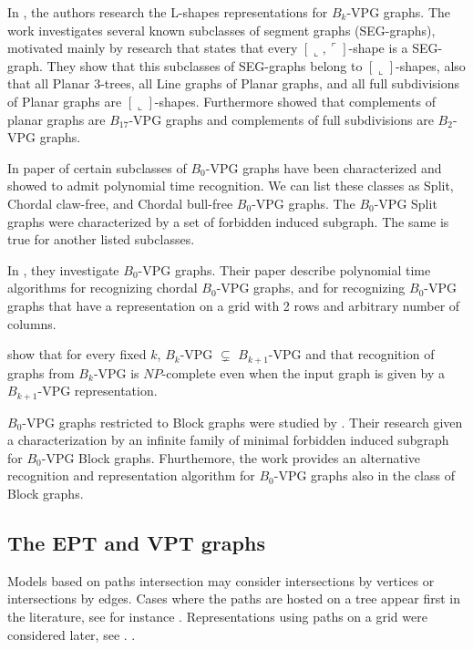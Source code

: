 In \citet{felsner2016intersection}, the authors research the L-shapes representations for $B_k$-VPG graphs. The work investigates several known subclasses of segment graphs (SEG-graphs), motivated mainly by research \cite{middendorf1992max} that states that every $[\llcorner, \ulcorner]$-shape is a SEG-graph.
They show that this subclasses of SEG-graphs belong to $[\llcorner]$-shapes, also that all Planar 3-trees, all Line graphs of Planar graphs, and all full subdivisions of Planar graphs are $[\llcorner]$-shapes. Furthermore \cite{felsner2016intersection} showed that complements of planar graphs are $B_{17}$-VPG graphs and complements of full subdivisions are $B_2$-VPG graphs. 

In paper of \citet{golumbic2013intersection} certain subclasses of $B_0$-VPG graphs have been characterized and showed to admit polynomial time recognition. We can list these classes as Split, Chordal claw-free, and Chordal bull-free $B_0$-VPG graphs.
The $B_0$-VPG Split graphs were characterized by  a set of forbidden induced subgraph. The same is true for another listed subclasses.


In \citet{chaplick2011recognizing}, they investigate  $B_0$-VPG graphs. Their paper describe polynomial time
algorithms for recognizing chordal $B_0$-VPG graphs, and for recognizing $B_0$-VPG graphs that have a representation on a grid with 2 rows and arbitrary number of columns.

\citet{chaplick2012bend} show  that for every fixed $k$, $B_k$-VPG $\subsetneq$ $B_{k+1}$-VPG and that recognition of graphs from $B_k$-VPG is $NP$-complete even when the input graph is given by a $B_{k+1}$-VPG representation. 


$B_0$-VPG graphs restricted to Block graphs were studied by \citet{Alcn2017VertexIG}. Their research given a characterization by an infinite family of minimal forbidden induced subgraph  for $B_0$-VPG Block graphs. Fhurthemore, the work provides an alternative recognition and representation algorithm for $B_0$-VPG graphs also in the class of Block graphs.





\subsection{The EPT and VPT graphs}

Models based on paths intersection  may consider  intersections by vertices or   intersections by edges.  Cases where the paths are hosted on a tree  appear first in the literature, see for instance \cite{gavril1978recognition, golumbic1985edge, golumbic1985}.  Representations using paths on a grid were considered later, see  \cite{golumbic2009,golumbic2013, golumbic2013intersection}. .

